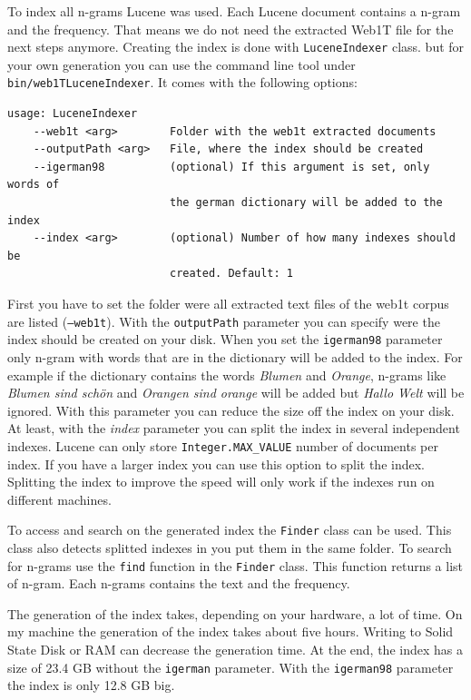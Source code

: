 \documentclass[11pt, accentcolor=tud9b, nochapname]{tudreport}
\begin{document}
To index all n-grams Lucene was used. Each Lucene document contains a n-gram and the frequency. That means we do not need the extracted Web1T file for the next steps anymore. Creating the index is done with \texttt{LuceneIndexer} class. but for your own generation you can use the command line tool under \texttt{bin/web1TLuceneIndexer}. It comes with the following options:

\begin{lstlisting}
usage: LuceneIndexer
    --web1t <arg>        Folder with the web1t extracted documents
    --outputPath <arg>   File, where the index should be created
    --igerman98          (optional) If this argument is set, only words of
                         the german dictionary will be added to the index
    --index <arg>        (optional) Number of how many indexes should be
                         created. Default: 1
\end{lstlisting}

First you have to set the folder were all extracted text files of the web1t corpus are listed (\texttt{--web1t}). With the \texttt{outputPath} parameter you can specify were the index should be created on your disk. When you set the \texttt{igerman98} parameter only n-gram with words that are in the dictionary will be added to the index. For example if the dictionary contains the words \emph{Blumen} and \emph{Orange}, n-grams like \emph{Blumen sind schön} and \emph{Orangen sind orange} will be added but \emph{Hallo Welt} will be ignored. With this parameter you can reduce the size off the index on your disk. At least, with the \emph{index} parameter you can split the index in several independent indexes. Lucene can only store \texttt{Integer.MAX\_VALUE} number of documents per index. If you have a larger index you can use this option to split the index. Splitting the index to improve the speed will only work if the indexes run on different machines.

To access and search on the generated index the \texttt{Finder} class can be used. This class also detects splitted indexes in you put them in the same folder. To search for n-grams use the \texttt{find} function in the \texttt{Finder} class. This function returns a list of n-gram. Each n-grams contains the text and the frequency.

The generation of the index takes, depending on your hardware, a lot of time. On my machine the generation of the index takes about five hours. Writing to Solid State Disk or RAM can decrease the generation time. At the end, the index has a size of 23.4 GB without the \texttt{igerman} parameter. With the \texttt{igerman98} parameter the index is only 12.8 GB big.
\end{document}
